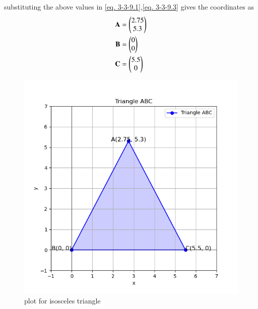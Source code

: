\documentclass[journal]{IEEEtran}
\begin{document}
 substituting the above values in \ref{eq. 3-3-9.1},\ref{eq. 3-3-9.3} gives the coordinates as\\
\begin{align*}
     \textbf{A}&=\begin{pmatrix}2.75\\5.3\end{pmatrix}\\
     \textbf{B}&=\begin{pmatrix}0\\0\end{pmatrix}\\
     \textbf{C}&=\begin{pmatrix}5.5\\0\end{pmatrix}
\end{align*}


\begin{figure}[h!]
\centering
\includegraphics[width=0.7\columnwidth]{figs/Figure_1.png}
\caption{plot for isosceles triangle}
 \label{fig. 3-3-9-1}
\end{figure}
\end{document}
